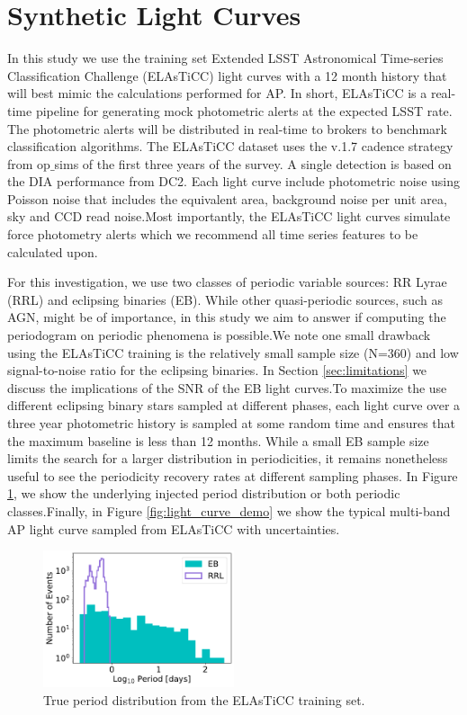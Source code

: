 \documentclass[DM,authoryear,toc]{lsstdoc}
\begin{document}
\section{Synthetic Light Curves}
In this study we use the training set Extended LSST Astronomical Time-series Classification Challenge (ELAsTiCC) light curves with a 12 month history that will best mimic the calculations performed for AP. In short, ELAsTiCC is a real-time pipeline for generating mock photometric alerts at the expected LSST rate. The photometric alerts will be distributed in real-time to brokers to benchmark classification algorithms.
The ELAsTiCC dataset uses the v.1.7 cadence strategy from op$\_$sims of the first three years of the survey.
A single detection is based on the DIA performance from DC2. Each light curve include photometric noise using Poisson noise that includes the equivalent area, background noise per unit area, sky and CCD read noise.Most importantly, the ELAsTiCC light curves simulate force photometry alerts which we recommend all time series features to be calculated upon.

	
For this investigation, we use two classes of periodic variable sources: RR Lyrae (RRL) and eclipsing binaries (EB). While other quasi-periodic sources, such as AGN, might be of importance, in this study we aim to answer if computing the periodogram on periodic phenomena is possible.We note one small drawback using the ELAsTiCC training is the relatively small sample size (N=360) and low signal-to-noise ratio for the eclipsing binaries. In Section \ref{sec:limitations} we discuss the implications of the SNR of the EB light curves.To maximize the use different eclipsing binary stars sampled at different phases, each light curve over a three year photometric history is sampled at some random time and ensures that the maximum baseline is less than 12 months.
While a small EB sample size limits the search for a larger distribution in periodicities, it remains nonetheless useful to see the periodicity recovery rates at different sampling phases. In Figure \ref{fig:period_distributions}, we show the underlying injected period distribution or both periodic classes.Finally, in Figure \ref{fig:light_curve_demo} we show the typical multi-band AP light curve sampled from ELAsTiCC with uncertainties.

\begin{figure}
  \includegraphics[width=0.5\textwidth]{figures/period_distribution.pdf}
  \centering 
  \caption{True period distribution from the ELAsTiCC training set.}
   \label{fig:period_distributions}
\end{figure}
\end{document}
